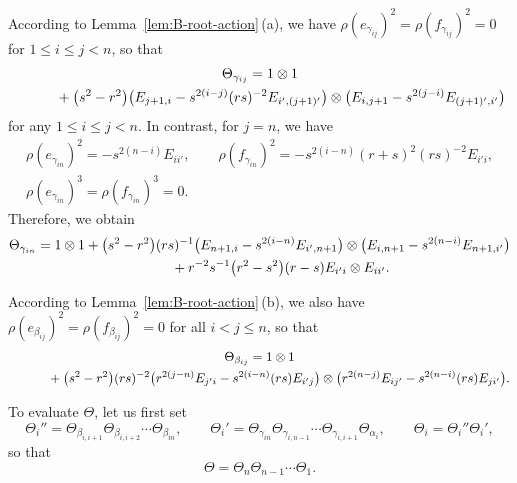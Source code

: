 \documentclass[pdftex]{sigma}
\numberwithin{equation}{section}
\begin{document}
According to Lemma~\ref{lem:B-root-action}\,(a), we have $\rho(e_{\gamma_{ij}})^{2} = \rho(f_{\gamma_{ij}})^{2} = 0$ for $1 \le i \le j < n$, so that
\begin{gather}
 \Theta_{\gamma_{ij}} = 1 \otimes 1\nonumber\\
 \hphantom{\Theta_{\gamma_{ij}} =}{}
 + \bigl(s^{2} - r^{2}\bigr)\bigl(E_{j + 1,i} - s^{2(i - j)}(rs)^{-2}E_{i',(j + 1)'}\bigr) \otimes \bigl(E_{i,j+1} - s^{2(j - i)}E_{(j + 1)',i'}\bigr)\label{eq:Theta_gamma_<n}
\end{gather}
for any $1 \le i \le j < n$. In contrast, for $j = n$, we have
\begin{gather*}
 \rho(e_{\gamma_{in}})^{2} = -s^{2(n - i)}E_{ii'}, \qquad
 \rho(f_{\gamma_{in}})^{2} = -s^{2(i - n)}(r + s)^{2}(rs)^{-2}E_{i'i}, \\
 \rho(e_{\gamma_{in}})^{3} = \rho(f_{\gamma_{in}})^{3} = 0.
\end{gather*}
Therefore, we obtain
\begin{gather}
 \Theta_{\gamma_{in}} = 1 \otimes 1
 + \bigl(s^{2} - r^{2}\bigr)(rs)^{-1} \bigl( E_{n + 1,i} - s^{2(i - n)}E_{i',n+1} \bigr) \otimes \bigl(E_{i,n+1} - s^{2(n - i)}E_{n + 1,i'}\bigr) \nonumber\\
 \hphantom{\Theta_{\gamma_{in}} =}{}
 + r^{-2}s^{-1}\bigl(r^{2} - s^{2}\bigr)(r - s) E_{i'i} \otimes E_{ii'}.\label{eq:Theta_gamma_n}
\end{gather}

According to Lemma~\ref{lem:B-root-action}\,(b), we also have $\rho(e_{\beta_{ij}})^{2} = \rho(f_{\beta_{ij}})^{2} = 0$ for all $i < j\leq n$, so that
\begin{gather*}
 \Theta_{\beta_{ij}} = 1 \otimes 1\\
 \hphantom{\Theta_{\beta_{ij}} =}{}
 +\bigl(s^{2} - r^{2}\bigr)(rs)^{-2} \bigl( r^{2(j - n)}E_{j'i} - s^{2(i - n)}(rs)E_{i'j} \bigr) \otimes \bigl(r^{2(n - j)}E_{ij'} - s^{2(n - i)}(rs)E_{ji'}\bigr).
\end{gather*}

To evaluate $\Theta$, let us first set
\begin{displaymath}
 \Theta_{i}'' = \Theta_{\beta_{i,i + 1}}\Theta_{\beta_{i,i + 2}}\cdots \Theta_{\beta_{in}}, \qquad
 \Theta_{i}' = \Theta_{\gamma_{in}}\Theta_{\gamma_{i,n-1}} \cdots \Theta_{\gamma_{i,i+1}}\Theta_{\alpha_{i}}, \qquad
 \Theta_{i} = \Theta_{i}''\Theta_{i}' ,
\end{displaymath}
so that
\begin{displaymath}
 \Theta = \Theta_{n}\Theta_{n-1}\cdots \Theta_{1}.
\end{displaymath}
\end{document}
